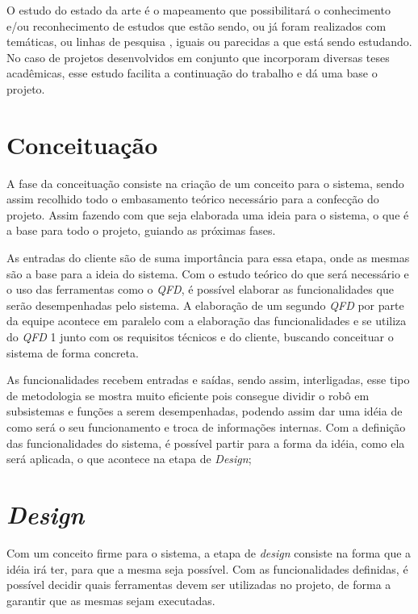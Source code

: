 O estudo do estado da arte é o mapeamento que possibilitará o conhecimento e/ou reconhecimento de estudos que estão sendo, ou já foram realizados com temáticas, ou linhas de pesquisa , iguais ou parecidas a que está sendo estudando. No caso de projetos desenvolvidos em conjunto que incorporam diversas teses acadêmicas, esse estudo facilita a continuação do trabalho e dá uma base o projeto.

\section{Conceituação}
\label{sec:conc}
A fase da conceituação consiste na criação de um conceito para o sistema, sendo assim recolhido todo o embasamento teórico necessário para a confecção do projeto. Assim fazendo com que seja elaborada uma ideia para o sistema, o que é a base para todo o projeto, guiando as próximas fases.

As entradas do cliente são de suma importância para essa etapa, onde as mesmas são a base para a ideia do sistema. Com o estudo teórico do que será necessário e o uso das ferramentas como o \textit{QFD}, é possível elaborar as funcionalidades que serão desempenhadas pelo sistema. A elaboração de um segundo \textit{QFD} por parte da equipe acontece em paralelo com a elaboração das funcionalidades e se utiliza do \textit{QFD} 1 junto com os requisitos técnicos e do cliente, buscando conceituar o sistema de forma concreta.

As funcionalidades recebem entradas e saídas, sendo assim, interligadas, esse tipo de metodologia se mostra muito eficiente pois consegue dividir o robô em subsistemas e funções a serem desempenhadas, podendo assim dar uma idéia de como será o seu funcionamento e troca de informações internas. Com a definição das funcionalidades do sistema, é possível partir para a forma da idéia, como ela será aplicada, o que acontece na etapa de \textit{Design};  


\section{\textit{Design}}
\label{sec:design}
Com um conceito firme para o sistema, a etapa de \textit{design} consiste na forma que a idéia irá ter, para que a mesma seja possível. Com as funcionalidades definidas, é possível decidir quais ferramentas devem ser utilizadas no projeto, de forma a garantir que as mesmas sejam executadas. 

